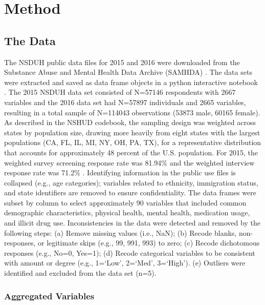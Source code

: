 \documentclass[sigconf]{acmart}
\begin{document}

\section{Method}

\subsection{The Data}

The NSDUH public data files for 2015 and 2016 were downloaded from the
Substance Abuse and Mental Health Data Archive (SAMHDA) \cite{samhsa18}. 
The data sets were extracted and saved as data frame objects in a python 
interactive notebook \cite{mckinney17, vanderplas17}. The 2015 NSDUH data set 
consisted of N=57146 respondents with 2667 variables and the 2016 data set had 
N=57897 individuals and 2665 variables, resulting in a total sample of N=114043 
observations (53873 male, 60165 female). As described in the NSHUD codebook, 
the sampling design was weighted across states by population size, drawing more 
heavily from eight states with the largest populations (CA, FL, IL, MI, NY, OH, 
PA, TX), for a representative distribution that accounts for approximately 
48 percent of the U.S. population. For 2015, the weighted survey screening 
response rate  was 81.94\% and the weighted interview response rate was 71.2\% 
\cite{samhsa18}. Identifying information in the public use files is collapsed 
(e.g., age categories); variables related to ethnicity, immigration status, and 
state identifiers are removed to ensure confidentiality. The data frames were 
subset by column to select approximately 90 variables that included common 
demographic characteristics, physical health, mental health, medication usage, 
and illicit drug use. Inconsistencies in the data were detected and removed by
the following steps: (a) Remove missing values (i.e., NaN); (b) Recode blanks, 
non-responses, or legitimate skips (e.g., 99, 991, 993) to zero; (c) Recode 
dichotomous responses (e.g., No=0, Yes=1); (d) Recode categorical variables 
to be consistent with amount or degree  (e.g., 1=`Low', 2=`Med', 3=`High'). 
(e) Outliers were identified and excluded from the data set (n=5).


\subsubsection{Aggregated Variables}
\end{document}
